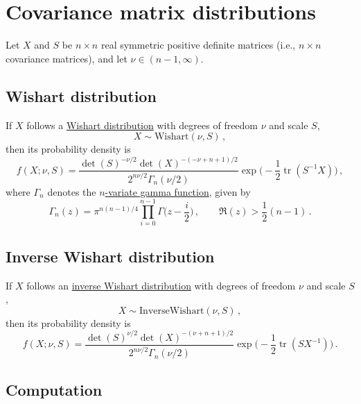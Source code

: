 \documentclass[12pt]{article}
\DeclareMathOperator{\tr}{tr}
\begin{document}
\section{Covariance matrix distributions}

Let $X$ and $S$ be $n \times n$ real symmetric positive definite matrices
(i.e., $n \times n$ covariance matrices), and let $\nu \in (n - 1, \infty)$.

\subsection{Wishart distribution}

If $X$ follows a
\href{https://mc-stan.org/docs/functions-reference/wishart-distribution.html}{Wishart distribution}
with degrees of freedom $\nu$ and scale $S$,
\begin{equation}
X \sim \mathrm{Wishart}(\nu,S)\,,
\end{equation}
then its probability density is
\begin{equation}
f(X;\nu,S) = \frac{\det(S)^{-\nu / 2} \det(X)^{-(-\nu + n + 1) / 2}}{2^{n \nu / 2} \Gamma_{n}(\nu / 2)} \exp\Big(-\frac{1}{2} \tr(S^{-1} X)\Big)\,,
\end{equation}
where $\Gamma_{n}$ denotes the
\href{https://en.wikipedia.org/wiki/Multivariate_gamma_function}{$n$-variate gamma function},
given by
\begin{equation}
\Gamma_{n}(z) = \pi^{n (n - 1) / 4} \prod_{i=0}^{n-1} \Gamma\Big(z - \frac{i}{2}\Big)\,,\qquad \Re(z) > \frac{1}{2}(n - 1)\,.
\end{equation}

\subsection{Inverse Wishart distribution}

If $X$ follows an
\href{https://mc-stan.org/docs/functions-reference/inverse-wishart-distribution.html}{inverse Wishart distribution}
with degrees of freedom $\nu$ and scale $S$,
\begin{equation}
X \sim \mathrm{InverseWishart}(\nu,S)\,,
\end{equation}
then its probability density is
\begin{equation}
f(X;\nu,S) = \frac{\det(S)^{\nu / 2} \det(X)^{-(\nu + n + 1) / 2}}{2^{n \nu / 2} \Gamma_{n}(\nu / 2)} \exp\Big(-\frac{1}{2} \tr(S X^{-1})\Big)\,.
\end{equation}

\subsection{Computation}
\end{document}
